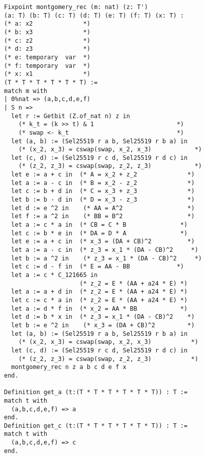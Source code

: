 \begin{lstlisting}[language=Coq]
Fixpoint montgomery_rec (m: nat) (z: T')
(a: T) (b: T) (c: T) (d: T) (e: T) (f: T) (x: T) :
(* a: x2              *)
(* b: x3              *)
(* c: z2              *)
(* d: z3              *)
(* e: temporary  var  *)
(* f: temporary  var  *)
(* x: x1              *)
(T * T * T * T * T * T) :=
match m with
| 0%nat => (a,b,c,d,e,f)
| S n =>
  let r := Getbit (Z.of_nat n) z in
    (* k_t = (k >> t) & 1                       *)
    (* swap <- k_t                              *)
  let (a, b) := (Sel25519 r a b, Sel25519 r b a) in
    (* (x_2, x_3) = cswap(swap, x_2, x_3)            *)
  let (c, d) := (Sel25519 r c d, Sel25519 r d c) in
    (* (z_2, z_3) = cswap(swap, z_2, z_3)            *)
  let e := a + c in  (* A = x_2 + z_2              *)
  let a := a - c in  (* B = x_2 - z_2              *)
  let c := b + d in  (* C = x_3 + z_3              *)
  let b := b - d in  (* D = x_3 - z_3              *)
  let d := e ^2 in    (* AA = A^2                  *)
  let f := a ^2 in    (* BB = B^2                  *)
  let a := c * a in  (* CB = C * B               *)
  let c := b * e in  (* DA = D * A               *)
  let e := a + c in  (* x_3 = (DA + CB)^2          *)
  let a := a - c in  (* z_3 = x_1 * (DA - CB)^2     *)
  let b := a ^2 in    (* z_3 = x_1 * (DA - CB)^2     *)
  let c := d - f in  (* E = AA - BB             *)
  let a := c * C_121665 in
                     (* z_2 = E * (AA + a24 * E) *)
  let a := a + d in  (* z_2 = E * (AA + a24 * E) *)
  let c := c * a in  (* z_2 = E * (AA + a24 * E) *)
  let a := d * f in  (* x_2 = AA * BB            *)
  let d := b * x in  (* z_3 = x_1 * (DA - CB)^2    *)
  let b := e ^2 in    (* x_3 = (DA + CB)^2         *)
  let (a, b) := (Sel25519 r a b, Sel25519 r b a) in
    (* (x_2, x_3) = cswap(swap, x_2, x_3)           *)
  let (c, d) := (Sel25519 r c d, Sel25519 r d c) in
    (* (z_2, z_3) = cswap(swap, z_2, z_3)           *)
  montgomery_rec n z a b c d e f x
end.

Definition get_a (t:(T * T * T * T * T * T)) : T :=
match t with
  (a,b,c,d,e,f) => a
end.
Definition get_c (t:(T * T * T * T * T * T)) : T :=
match t with
  (a,b,c,d,e,f) => c
end.
\end{lstlisting}

